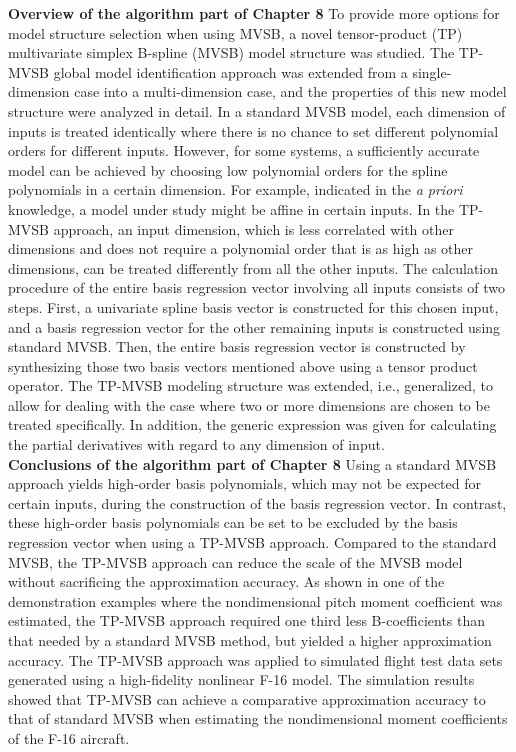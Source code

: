 \noindent \textbf{Overview of the algorithm part of Chapter 8} To provide more options for model structure selection when using \ac{MVSB}, a novel tensor-product (TP) multivariate simplex B-spline (\ac{MVSB}) model structure was studied. The \ac{TP-MVSB} global model identification approach was extended from a single-dimension case into a multi-dimension case, and the properties of this new model structure were analyzed in detail.
In a standard \ac{MVSB} model, each dimension of inputs is treated identically where there is no chance to set different polynomial orders for different inputs. However, for some systems, a sufficiently accurate model can be achieved by choosing low polynomial orders for the spline polynomials in a certain dimension. For example, indicated in the \textit{a priori} knowledge, a model under study might be affine in certain inputs.
In the \ac{TP-MVSB} approach, an input dimension, which is less correlated with other dimensions and does not require a polynomial order that is as high as other dimensions, can be treated differently from all the other inputs. The calculation procedure of the entire basis regression vector involving all inputs consists of two steps. First, a univariate spline basis vector is constructed for this chosen input, and a basis regression vector for the other remaining inputs is constructed using standard \ac{MVSB}. Then, the entire basis regression vector is constructed by synthesizing those two basis vectors mentioned above using a tensor product operator. The \ac{TP-MVSB} modeling structure was extended, i.e., generalized, to allow for dealing with the case where two or more dimensions are chosen to be treated specifically. In addition, the generic expression was given for calculating the partial derivatives with regard to any dimension of input.\\

\noindent \textbf{Conclusions of the algorithm part of Chapter 8} Using a standard \ac{MVSB} approach yields high-order basis polynomials, which may not be expected for certain inputs, during the construction of the basis regression vector. In contrast, these high-order basis polynomials can be set to be excluded by the basis regression vector when using a TP-MVSB approach. Compared to the standard \ac{MVSB}, the \ac{TP-MVSB} approach can reduce the scale of the \ac{MVSB} model without sacrificing the approximation accuracy. As shown in one of the demonstration examples where the nondimensional pitch moment coefficient was estimated, the \ac{TP-MVSB} approach required one third less B-coefficients than that needed by a standard \ac{MVSB} method, but yielded a higher approximation accuracy.
The \ac{TP-MVSB} approach was applied to simulated flight test data sets generated using a high-fidelity nonlinear F-16 model. The simulation results showed that \ac{TP-MVSB} can achieve a comparative approximation accuracy to that of standard \ac{MVSB} when estimating the nondimensional moment coefficients of the F-16 aircraft.

